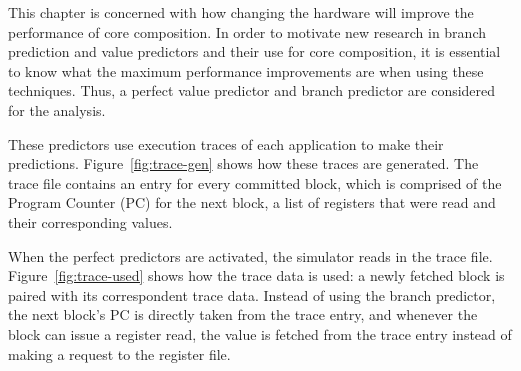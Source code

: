 This chapter is concerned with how changing the hardware will improve the performance of core composition.
In order to motivate new research in branch prediction and value predictors and their use for core composition, it is essential to know what the maximum performance improvements are when using these techniques. %
Thus, a perfect value predictor and branch predictor are considered for the analysis.

These predictors use execution traces of each application to make their predictions.
Figure~\ref{fig:trace-gen} shows how these traces are generated.
The trace file contains an entry for every committed block, which is comprised of the Program Counter (PC) for the next block, a list of registers that were read and their corresponding values.

When the perfect predictors are activated, the simulator reads in the trace file.
Figure~\ref{fig:trace-used} shows how the trace data is used: a newly fetched block is paired with its correspondent trace data.
Instead of using the branch predictor, the next block's PC is directly taken from the trace entry, and whenever the block can issue a register read, the value is fetched from the trace entry instead of making a request to the register file.
\vspace{-2em}
